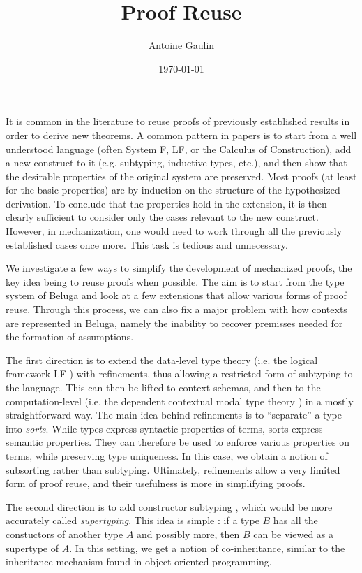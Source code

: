 \documentclass[letterpaper, 11pt]{article}
\title{Proof Reuse}
\date{\today}
\author{Antoine Gaulin}
\begin{document}
    \maketitle
    
    It is common in the literature to reuse proofs of previously established results in order to derive new theorems.  A common pattern in papers
    is to start from a well understood language (often System F, LF, or the Calculus of Construction), add a new construct to it (e.g. subtyping,
    inductive types, etc.), and then show that the desirable properties of the original system are preserved.  Most proofs (at least for the basic
    properties) are by induction on the structure of the hypothesized derivation.  To conclude that the properties hold in the extension, it is then
    clearly sufficient to consider only the cases relevant to the new construct.  However, in mechanization, one would need to work through all the
    previously established cases once more.  This task is tedious and unnecessary.

    We investigate a few ways to simplify the development of mechanized proofs, the key idea being to reuse proofs when possible.
    The aim is to start from the type system of Beluga \cite{Pientka2008, PientkaDunfield2008} and look at a few extensions that allow 
    various forms of proof reuse.
    Through this process, we can also fix a major problem with how contexts are represented in Beluga, namely the inability to
    recover premisses needed for the formation of assumptions.

    The first direction is to extend the data-level type theory (i.e. the logical framework LF \cite{LF1987}) with refinements, 
    thus allowing a restricted form of subtyping to the language.
    This can then be lifted to context schemas, and then to the computation-level (i.e. the dependent contextual modal type theory \cite{Nanevski2008})
    in a mostly straightforward way.  The main idea behind refinements is to ``separate'' a type into \textit{sorts}.  While types express
    syntactic properties of terms, sorts express semantic properties.  They can therefore be used to enforce various properties on terms,
    while preserving type uniqueness.  In this case, we obtain a notion of subsorting rather than subtyping.  Ultimately, refinements allow
    a very limited form of proof reuse, and their usefulness is more in simplifying proofs.
    
    The second direction is to add constructor subtyping \cite{Poll1997, BarthesFrade1999}, which would be more accurately called \textit{supertyping}.
    This idea is simple : if a type $B$ has all the constuctors of another type $A$ and possibly more, then $B$ can be viewed as a supertype of $A$.
    In this setting, we get a notion of co-inheritance, similar to the inheritance mechanism found in object oriented programming.
\end{document}
